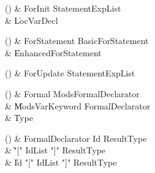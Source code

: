 \begin{bbgrammarappendix}

() & ForInit \label{prod:ForInit}  \: StatementExpList  \\

 &    \| LocVarDecl \\

\end{bbgrammarappendix}

\begin{bbgrammarappendix}

() & ForStatement \label{prod:ForStatement}  \: BasicForStatement  \\

 &    \| EnhancedForStatement \\

\end{bbgrammarappendix}

\begin{bbgrammarappendix}

() & ForUpdate \label{prod:ForUpdate}  \: StatementExpList  \\


\end{bbgrammarappendix}

\begin{bbgrammarappendix}

() & Formal \label{prod:Formal}  \: Mods\opt FormalDeclarator  \\

 &    \| Mods\opt VarKeyword FormalDeclarator \\
 &    \| Type \\

\end{bbgrammarappendix}

\begin{bbgrammarappendix}

() & FormalDeclarator \label{prod:FormalDeclarator}  \: Id ResultType  \\

 &    \| \xcd"[" IdList \xcd"]" ResultType \\
 &    \| Id \xcd"[" IdList \xcd"]" ResultType \\

\end{bbgrammarappendix}

